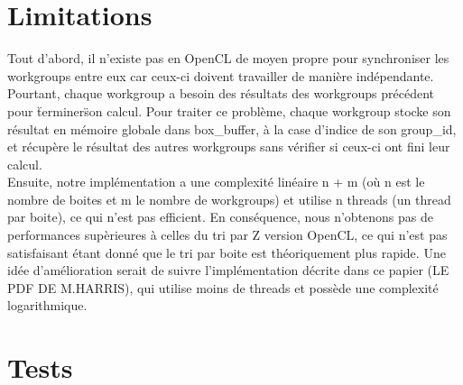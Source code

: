 \documentclass[]{article}
\begin{document}
\section{Limitations}

Tout d'abord, il n'existe pas en OpenCL de moyen propre pour synchroniser les workgroups entre eux car ceux-ci doivent travailler de manière indépendante. Pourtant, chaque workgroup a besoin des résultats des workgroups précédent pour \"terminer\" son calcul. Pour traiter ce problème, chaque workgroup stocke son résultat en mémoire globale dans box\_buffer, à la case d'indice de son group\_id, et récupère le résultat des autres workgroups sans vérifier si ceux-ci ont fini leur calcul. \\

Ensuite, notre implémentation a une complexité linéaire n + m (où n est le nombre de boites et m le nombre de workgroups) et utilise n threads (un thread par boite), ce qui n'est pas efficient. En conséquence, nous n'obtenons pas de performances supèrieures à celles du tri par Z version OpenCL, ce qui n'est pas satisfaisant étant donné que le tri par boite est théoriquement plus rapide. Une idée d'amélioration serait de suivre l'implémentation décrite dans ce papier (LE PDF DE M.HARRIS), qui utilise moins de threads et possède une complexité logarithmique.\\



\section{Tests}
\end{document}
